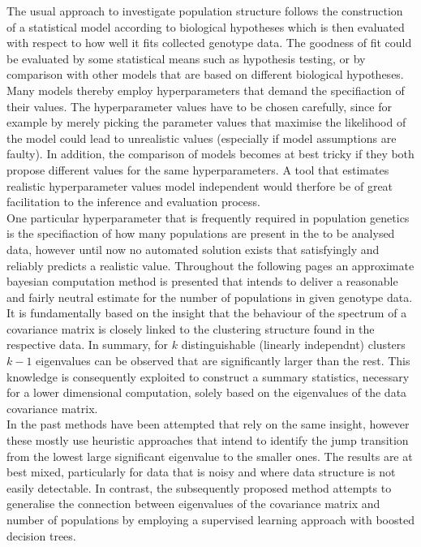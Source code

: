 \documentclass[a4paper, 11pt]{article}
\begin{document}
The usual approach to investigate population structure follows the construction of a statistical model according to biological hypotheses which is then evaluated with respect to how well it fits collected genotype data. The goodness of fit could be evaluated by some statistical means such as hypothesis testing, or by comparison with other models that are based on different biological hypotheses.  Many models thereby employ hyperparameters that demand the specifiaction of their values. The hyperparameter values have to be chosen carefully, since for example by merely picking the parameter values that maximise the likelihood of the model could lead to unrealistic values (especially if model assumptions are faulty). In addition, the comparison of models becomes at best tricky if they both propose different values for the same hyperparameters. A tool that estimates realistic hyperparameter values model independent would therfore be of great facilitation to the inference and evaluation process.\\
One particular hyperparameter that is frequently required in population genetics is the specifiaction of how many populations are present in the to be analysed data, however until now no automated solution exists that satisfyingly and reliably predicts a realistic value. Throughout the following pages an approximate bayesian computation method is presented that intends to deliver a reasonable and fairly neutral estimate for the number of populations in given genotype data.\\
It is fundamentally based on the insight that the behaviour of the spectrum of a covariance matrix is closely linked to the clustering structure found in the respective data. In summary, for $k$ distinguishable (linearly independnt) clusters $k-1$ eigenvalues can be observed that are significantly larger than the rest. This knowledge is consequently exploited to construct a summary statistics, necessary for a lower dimensional computation, solely based on the eigenvalues of the data covariance matrix.\\
In the past methods have been attempted that rely on the same insight, however these mostly use heuristic approaches that intend to identify the jump transition from the lowest large significant eigenvalue to the smaller ones. The results are at best mixed, particularly for data that is noisy and where data structure is not easily detectable. In contrast, the subsequently proposed method attempts to generalise the connection between eigenvalues of the covariance matrix and number of populations by employing a supervised learning approach with boosted decision trees.\\
\end{document}
